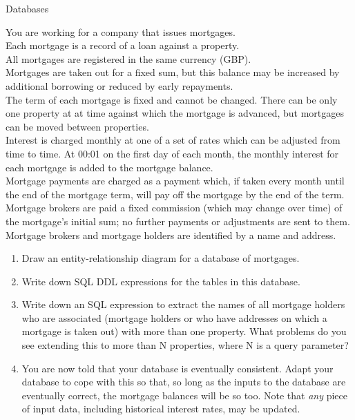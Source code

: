 \documentclass{tripos}
\begin{document}
\begin{question}[MockIA,year=2025,paper=1,question=4,author=rrw]{Databases}

  You are working for a company that issues mortgages.\\
  Each mortgage is a record of a loan against a property.\\
  All mortgages are registered in the same currency (GBP).\\
  Mortgages are taken out for a fixed sum, but this balance may be increased by additional borrowing or reduced by early repayments.\\
  The term of each mortgage is fixed and cannot be changed. There can be only one property at at time against which the mortgage is advanced, but mortgages can be moved between properties.\\
  Interest is charged monthly at one of a set of rates which can be adjusted from time to time. At 00:01 on the first day of each month, the monthly interest for each mortgage is added to the mortgage balance.\\
  Mortgage payments are charged as a payment which, if taken every month until the end of the mortgage term, will pay off the mortgage by the end of the term.\\
  Mortgage brokers are paid a fixed commission (which may change over time) of the mortgage's initial sum; no further payments or adjustments are sent to them.\\
  Mortgage brokers and mortgage holders are identified by a name and address.\\
  \begin{enumerate}
  \item Draw an entity-relationship diagram for a database of mortgages. 
  \item Write down SQL DDL expressions for the tables in this database. 
  \item Write down an SQL expression to extract the names of all mortgage holders who are associated (mortgage holders or who have addresses on which a mortgage is taken out) with more than one property. What problems do you see extending this to more than N properties, where N is a query parameter?
  \item You are now told that your database is eventually consistent. Adapt your database to cope with this so that, so long as the inputs to the database are eventually correct, the mortgage balances will be so too. Note that {\em any} piece of input data, including historical interest rates, may be updated. 

\end{enumerate}
\end{question}
\end{document}
